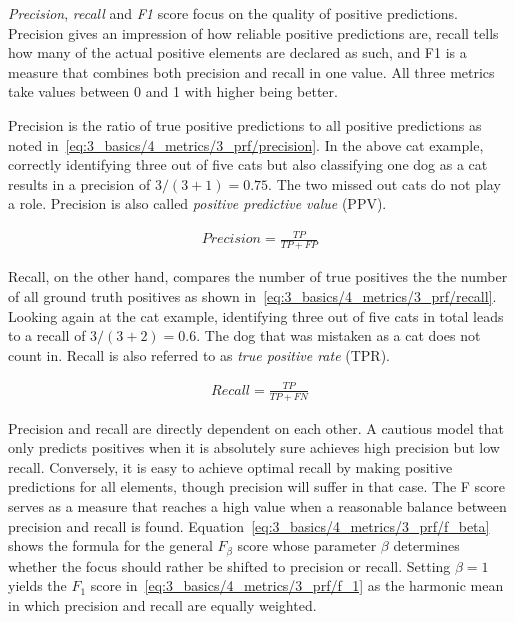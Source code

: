 \emph{Precision}, \emph{recall} and \emph{F1} score focus on the quality of positive predictions. Precision gives an impression of how reliable positive predictions are, recall tells how many of the actual positive elements are declared as such, and F1 is a measure that combines both precision and recall in one value. All three metrics take values between 0 and 1 with higher being better.

Precision is the ratio of true positive predictions to all positive predictions as noted in~\ref{eq:3_basics/4_metrics/3_prf/precision}. In the above cat example, correctly identifying three out of five cats but also classifying one dog as a cat results in a precision of $3 / (3 + 1) = 0.75$. The two missed out cats do not play a role. Precision is also called \emph{positive predictive value} (PPV).

\begin{align}
    Precision = \frac{TP}{TP + FP}
    \label{eq:3_basics/4_metrics/3_prf/precision}
\end{align}

Recall, on the other hand, compares the number of true positives the the number of all ground truth positives as shown in~\ref{eq:3_basics/4_metrics/3_prf/recall}. Looking again at the cat example, identifying three out of five cats in total leads to a recall of $3 / (3 + 2) = 0.6$. The dog that was mistaken as a cat does not count in. Recall is also referred to as \emph{true positive rate} (TPR).

\begin{align}
    Recall = \frac{TP}{TP + FN}
    \label{eq:3_basics/4_metrics/3_prf/recall}
\end{align}

Precision and recall are directly dependent on each other. A cautious model that only predicts positives when it is absolutely sure achieves high precision but low recall. Conversely, it is easy to achieve optimal recall by making positive predictions for all elements, though precision will suffer in that case. The F score serves as a measure that reaches a high value when a reasonable balance between precision and recall is found. Equation~\ref{eq:3_basics/4_metrics/3_prf/f_beta} shows the formula for the general $F_\beta$ score whose parameter $\beta$ determines whether the focus should rather be shifted to precision or recall. Setting $\beta = 1$ yields the $F_1$ score in~\ref{eq:3_basics/4_metrics/3_prf/f_1} as the harmonic mean in which precision and recall are equally weighted.


